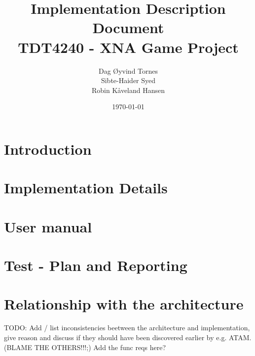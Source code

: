 \documentclass[titlepage,a4paper,11pt]{article}
\date{\today}
\begin{document}
\title{Implementation Description Document\\
 		TDT4240 - XNA Game Project}

\author{Dag Øyvind Tornes\\
 		Sibte-Haider Syed\\ 
		Robin Kåveland Hansen\\}
\maketitle
\newpage
\thispagestyle{empty}
\mbox{}

	
\newpage
\thispagestyle{empty}
\mbox{}

\pagestyle{empty}
\tableofcontents
\clearpage

\pagestyle{fancy}
\rhead{\color{my_color}\Huge\thesection}
\lhead{}
\renewcommand{\headrulewidth}{0pt}

%
%

\pagestyle{empty}

\section{Introduction}
\newpage
	

\section{Implementation Details}
\newpage
	
	
\section{User manual}
\newpage
	

\section{Test - Plan and Reporting}
\newpage
	
	
\section{Relationship with the architecture}
\newpage	TODO: Add / list inconsistencies beetween the architecture and implementation, give reason and discuss if they should
	have been discovered earlier by e.g. ATAM. (BLAME THE OTHERS!!!;)
	Add the func reqs here?
	
\end{document}
